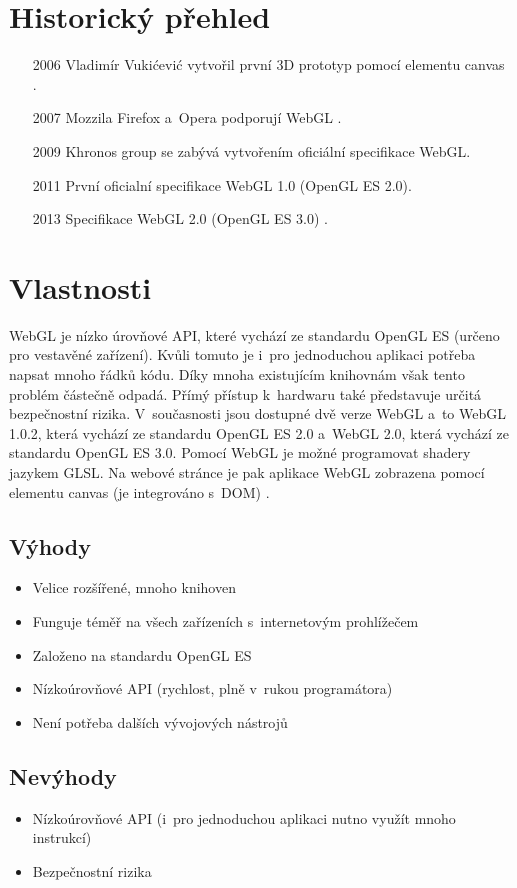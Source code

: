 \documentclass[12pt,a4paper,titlepage,final]{report}
\begin{document}
\section{Historický přehled}
\begin{itemize}
	\item[2006] Vladimír Vukićević vytvořil první 3D prototyp pomocí elementu canvas \cite{history}.
	\item[2007] Mozzila Firefox a~Opera podporují WebGL \cite{history}.
	\item[2009] Khronos group se zabývá vytvořením oficiální specifikace WebGL.
	\item[2011] První oficialní specifikace WebGL 1.0 (OpenGL ES 2.0)\cite{history}.
	\item[2013] Specifikace WebGL 2.0 (OpenGL ES 3.0) \cite{history2}.
\end{itemize}

\section{Vlastnosti}
WebGL je nízko úrovňové API, které vychází ze standardu OpenGL ES (určeno pro vestavěné zařízení). Kvůli tomuto je i~pro jednoduchou aplikaci potřeba napsat mnoho řádků kódu. Díky mnoha existujícím knihovnám však tento problém částečně odpadá. Přímý přístup k~hardwaru také představuje určitá bezpečnostní rizika. V~současnosti jsou dostupné dvě verze WebGL a~to WebGL 1.0.2, která vychází ze standardu OpenGL ES 2.0 a~WebGL 2.0, která vychází ze standardu OpenGL ES 3.0. Pomocí WebGL je možné programovat shadery jazykem GLSL. Na webové stránce je pak aplikace WebGL zobrazena pomocí elementu canvas (je integrováno s~DOM) \cite{khronos}.

\subsection{Výhody}
\begin{itemize}
	\item Velice rozšířené, mnoho knihoven
	\item Funguje téměř na všech zařízeních s~internetovým prohlížečem	
	\item Založeno na standardu OpenGL ES
  \item Nízkoúrovňové API (rychlost, plně v~rukou programátora)
  \item Není potřeba dalších vývojových nástrojů
\end{itemize}
\subsection{Nevýhody}
\begin{itemize}
	\item Nízkoúrovňové API (i~pro jednoduchou aplikaci nutno využít mnoho instrukcí)
	\item Bezpečnostní rizika	
\end{itemize}
\end{document}
